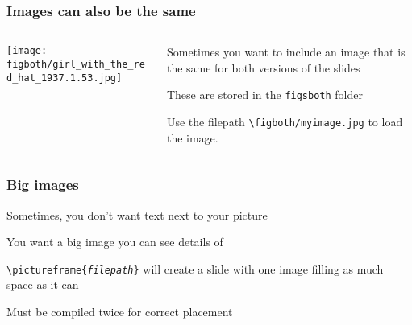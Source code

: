\documentclass[aspectratio=169,handout]{beamer}
\begin{document}


	

\begin{frame}
	\frametitle{Images can also be the same}
	\begin{columns}[T] %
	\begin{column}{.48\textwidth}
		\texttt{[image: \\figboth/girl\_with\_the\_red\_hat\_1937.1.53.jpg]}
	\end{column}%
	\hfill%
	\begin{column}{.48\textwidth}
		\begin{witem}
		\item Sometimes you want to include an image that is the same for both versions
			of the slides
		\item These are stored in the \texttt{figs\textunderscore{}both} folder
		\item Use the filepath \texttt{\textbackslash{}figboth/myimage.jpg} to load the image.
	\end{witem}
	\end{column}%
	\end{columns}
\end{frame}



\begin{frame}
	\frametitle{Big images}
	\begin{witem}
		\item Sometimes, you don't want text next to your picture
		\item You want a big image you can see details of
		\item \texttt{\textbackslash{}pictureframe\{\textit{filepath}\}} will create
			a slide with one image filling as much space as it can
		\item Must be compiled twice for correct placement
	\end{witem}
\end{frame}
\end{document}
